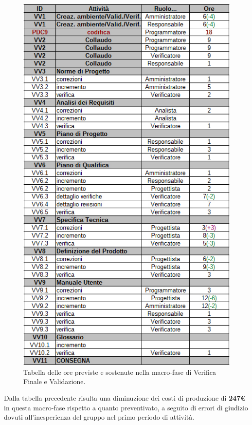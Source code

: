 \begin{figure}[H]
\begin{center}
\includegraphics[scale=0.60]{img/consuntivo-verival.jpg}
\caption{Tabella delle ore previste e sostenute nella macro-fase di Verifica Finale e Validazione.}
\end{center}
\end{figure}

Dalla tabella precedente risulta una diminuzione dei costi di produzione di \textbf{247€} in questa macro-fase rispetto a quanto preventivato, a seguito di errori di giudizio dovuti all'inesperienza del gruppo nel primo periodo di attività.

